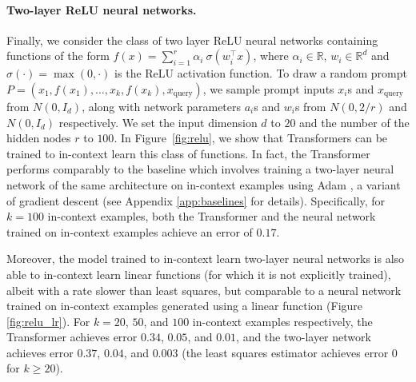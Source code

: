 \paragraph{Two-layer ReLU neural networks.}
Finally, we consider the class of two layer ReLU neural 
networks containing functions of the form $f(x) = \sum_{i=1}^r \alpha_i \ \sigma(w_i^\top x)$, where $\alpha_i \in \mathbb{R}$, $w_i \in \mathbb{R}^d$ and $\sigma(\cdot) = \max(0, \cdot)$ is the ReLU activation function.
To draw a random prompt $P = (x_1, f(x_1), \ldots, x_k, f(x_k), x_\text{query})$, we sample prompt inputs $x_i$s and $x_\text{query}$ from $N(0, I_d)$, along with network parameters $a_i$s and $w_i$s from $N(0, {2/r})$ and $N(0, I_d)$ respectively. We set the input dimension $d$ to $20$ and the number of the hidden nodes $r$ to $100$. 
In Figure~\ref{fig:relu}, we show that Transformers can be trained to in-context learn this class of functions.
In fact, the Transformer performs comparably to the baseline 
 which involves training a two-layer neural network of the same architecture on in-context examples using Adam \citep{kingma2014adam}, a variant of gradient descent
(see Appendix \ref{app:baselines} for details). Specifically, for $k=100$ in-context examples, both the Transformer and the neural network trained on in-context examples achieve an error of $0.17$.



Moreover, the model trained to in-context learn two-layer neural networks is also able to in-context learn linear functions (for which it is not explicitly trained), albeit with a rate slower than least squares, but comparable to a neural network trained on in-context examples generated using a linear function (Figure \ref{fig:relu_lr}). For $k=20$, $50$, and $100$ in-context examples respectively, the Transformer achieves error $0.34$, $0.05$, and $0.01$, and the two-layer network achieves error $0.37$, $0.04$, and $0.003$ (the least squares estimator achieves error $0$ for $k\geq 20$).



